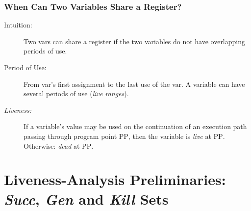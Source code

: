 \documentclass{beamer}
\renewcommand{\emph}[1]{\textcolor{structure}{#1}}
\begin{document}
\begin{frame}[fragile,t]
   \frametitle{When Can Two Variables Share a Register?}

\bigskip
\bigskip

\begin{description}

    \item[Intuition:] Two vars can share a register if the two variables do not
                        have overlapping \emph{periods of use}.\bigskip

    \item[Period of Use:] From var's first assignment to the last use of the var.
                A variable can have several periods of use (\emph{\em live ranges}).\bigskip

    \item[{\em Liveness:}] If a variable's value may be used on the continuation of
                            an execution path passing through program point \textsc{PP},
                            then the variable is {\em live} at \textsc{PP}. 
                            Otherwise: {\em dead} at \textsc{PP}.\bigskip

\end{description}

\end{frame}



\section{Liveness-Analysis Preliminaries: {\em Succ}, {\em Gen} and {\em Kill} Sets}

\begin{frame}[fragile]
	\tableofcontents[currentsection]
\end{frame}
\end{document}
